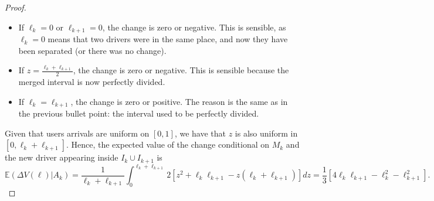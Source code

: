 \documentclass[12pt,english]{article}
\begin{document}
{\begin{proof}
\begin{itemize}
    \item If $\ell_k=0$ or $\ell_{k+1}=0$, the change is zero or negative. This is sensible, as $\ell_k=0$ means that two drivers were in the same place, and now they have been separated (or there was no change).
    \item If $z=\frac{\ell_k+\ell_{k+1}}{2}$, the change is zero or negative. This is sensible because the merged interval is now perfectly divided.
    \item If $\ell_k=\ell_{k+1}$, the change is zero or positive. The reason is the same as in the previous bullet point: the interval used to be perfectly divided.
\end{itemize}
Given that users arrivals are uniform on $[0,1]$, we have that $z$ is also uniform in $[0,\ell_k+\ell_{k+1}]$. Hence, the expected value of the change conditional on $M_k$ and  the new driver appearing inside $I_k\cup I_{k+1}$ is
\begin{equation}\label{Eq:SummaryChange1}
\mathbb{E}(\Delta V(\ell)|A_k)=  \frac{1}{\ell_k+\ell_{k+1}} \int_0^{\ell_k+\ell_{k+1}} 2[z^2+\ell_k\ell_{k+1}-z(\ell_k+\ell_{k+1})] dz = \frac{1}{3}[4\ell_k\ell_{k+1}-\ell_k^2-\ell_{k+1}^2].
\end{equation}


\end{proof}}
\end{document}
